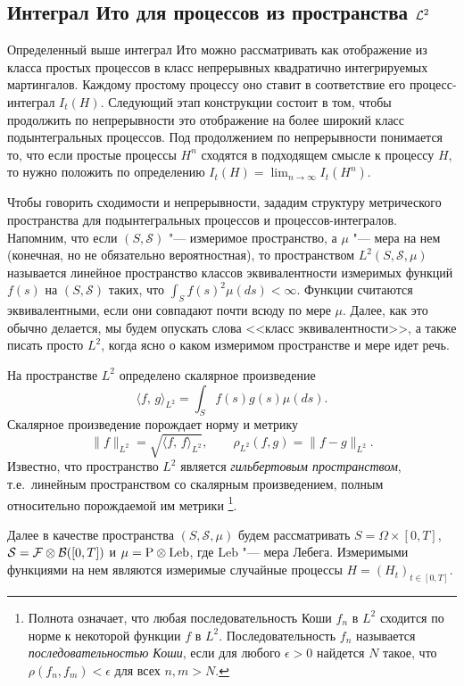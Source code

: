 \subsection{Интеграл Ито для процессов из пространства $\L^2$}

Определенный выше интеграл Ито можно рассматривать как отображение из класса простых процессов в класс непрерывных квадратично интегрируемых мартингалов.
Каждому простому процессу оно ставит в соответствие его процесс-интеграл $I_t(H)$.
Следующий этап конструкции состоит в том, чтобы продолжить по непрерывности это отображение на более широкий класс подынтегральных процессов.
Под продолжением по непрерывности понимается то, что если простые процессы $H^n$ сходятся в подходящем смысле к процессу $H$, то нужно положить по определению $I_t(H) = \lim_{n\to\infty} I_t(H^n)$.

Чтобы говорить сходимости и непрерывности, зададим структуру метрического пространства для подынтегральных процессов и процессов-интегралов. 
Напомним, что если $(S,\mathcal{S})$ "--- измеримое пространство, а $\mu$ "--- мера на нем (конечная, но не обязательно вероятностная), то пространством $L^2(S,\mathcal{S},\mu)$ называется линейное пространство классов эквивалентности измеримых функций $f(s)$ на $(S,\mathcal{S})$ таких, что $\int_S f(s)^2 \mu(ds) < \infty$.
Функции считаются эквивалентными, если они совпадают почти всюду по мере $\mu$.
Далее, как это обычно делается, мы будем опускать слова <<класс эквивалентности>>, а также писать просто $L^2$, когда ясно о каком измеримом пространстве и мере идет речь.

На пространстве $L^2$ определено скалярное произведение
\[
\langle f,\, g\rangle_{L^2} = \int_S f(s)g(s) \mu(ds).
\]
Скалярное произведение порождает норму и метрику
\[
\|f\|_{L^2} = \sqrt{\langle f,\, f\rangle_{L^2}}, \qquad \rho_{L^2}(f, g) = \|f-g\|_{L^2}.
\]
Известно, что пространство $L^2$ является \emph{гильбертовым пространством}, т.е.\ линейным пространством со скалярным произведением, полным относительно порождаемой им метрики%
\footnote{Полнота означает, что любая последовательность Коши $f_n$ в $L^2$ сходится по норме к некоторой функции $f$ в $L^2$.
Последовательность $f_n$ называется \emph{последовательностью Коши}, если для любого $\epsilon>0$ найдется $N$ такое, что $\rho(f_n, f_m) < \epsilon$ для всех $n,m>N$.}.

Далее в качестве пространства $(S,\mathcal{S},\mu)$ будем рассматривать $S=\Omega\times [0,T]$, $\mathcal{S} = \F\otimes\B([0,T])$ и $\mu=\P\otimes\mathrm{Leb}$, где $\mathrm{Leb}$ "--- мера Лебега.
Измеримыми функциями на нем являются измеримые случайные процессы $H=(H_t)_{t\in[0,T]}$.


